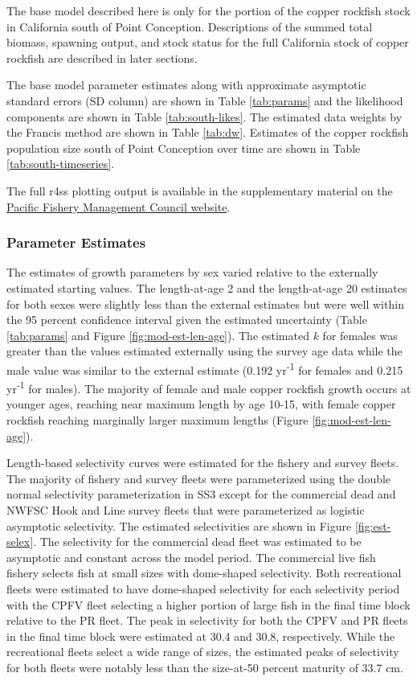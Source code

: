 \documentclass[11pt,
  english,
  letterpaper,
]{article}
\begin{document}
The base model described here is only for the portion of the copper rockfish stock in California south of Point Conception. Descriptions of the summed total biomass, spawning output, and stock status for the full California stock of copper rockfish are described in later sections.

The base model parameter estimates along with approximate asymptotic standard errors (SD column) are shown in Table \ref{tab:params} and the likelihood components are shown in Table \ref{tab:south-likes}. The estimated data weights by the Francis method are shown in Table \ref{tab:dw}. Estimates of the copper rockfish population size south of Point Conception over time are shown in Table \ref{tab:south-timeseries}.

The full r4ss plotting output is available in the supplementary material on the \href{pcouncil.org}{Pacific Fishery Management Council website}.

\hypertarget{parameter-estimates}{%
\subsubsection{Parameter Estimates}\label{parameter-estimates}}

The estimates of growth parameters by sex varied relative to the externally estimated starting values. The length-at-age 2 and the length-at-age 20 estimates for both sexes were slightly less than the external estimates but were well within the 95 percent confidence interval given the estimated uncertainty (Table \ref{tab:params} and Figure \ref{fig:mod-est-len-age}). The estimated \(k\) for females was greater than the values estimated externally using the survey age data while the male value was similar to the external estimate (0.192 yr\textsuperscript{-1} for females and 0.215 yr\textsuperscript{-1} for males). The majority of female and male copper rockfish growth occurs at younger ages, reaching near maximum length by age 10-15, with female copper rockfish reaching marginally larger maximum lengths (Figure \ref{fig:mod-est-len-age}).

Length-based selectivity curves were estimated for the fishery and survey fleets. The majority of fishery and survey fleets were parameterized using the double normal selectivity parameterization in SS3 except for the commercial dead and NWFSC Hook and Line survey fleets that were parameterized as logistic asymptotic selectivity. The estimated selectivities are shown in Figure \ref{fig:est-selex}. The selectivity for the commercial dead fleet was estimated to be asymptotic and constant across the model period. The commercial live fish fishery selects fish at small sizes with dome-shaped selectivity. Both recreational fleets were estimated to have dome-shaped selectivity for each selectivity period with the CPFV fleet selecting a higher portion of large fish in the final time block relative to the PR fleet. The peak in selectivity for both the CPFV and PR fleets in the final time block were estimated at 30.4 and 30.8, respectively. While the recreational fleets select a wide range of sizes, the estimated peaks of selectivity for both fleets were notably less than the size-at-50 percent maturity of 33.7 cm.
\end{document}
